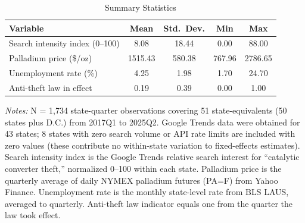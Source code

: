 \begin{table}[H]
\centering
\caption{Summary Statistics}
\begin{threeparttable}
\begin{tabular}{lcccc}
\toprule
Variable & Mean & Std.\ Dev. & Min & Max \\
\midrule
Search intensity index (0--100) & 8.08 & 18.44 & 0.00 & 88.00 \\
Palladium price (\$/oz) & 1515.43 & 580.38 & 767.96 & 2786.65 \\
Unemployment rate (\%) & 4.25 & 1.98 & 1.70 & 24.70 \\
Anti-theft law in effect & 0.19 & 0.39 & 0.00 & 1.00 \\
\bottomrule
\end{tabular}
\begin{tablenotes}[flushleft]
\small
\item \textit{Notes:} N = 1,734 state-quarter observations covering 51 state-equivalents (50 states plus D.C.) from 2017Q1 to 2025Q2. Google Trends data were obtained for 43 states; 8 states with zero search volume or API rate limits are included with zero values (these contribute no within-state variation to fixed-effects estimates). Search intensity index is the Google Trends relative search interest for ``catalytic converter theft,'' normalized 0--100 within each state. Palladium price is the quarterly average of daily NYMEX palladium futures (PA=F) from Yahoo Finance. Unemployment rate is the monthly state-level rate from BLS LAUS, averaged to quarterly. Anti-theft law indicator equals one from the quarter the law took effect.
\end{tablenotes}
\end{threeparttable}
\label{tab:summary}
\end{table}
